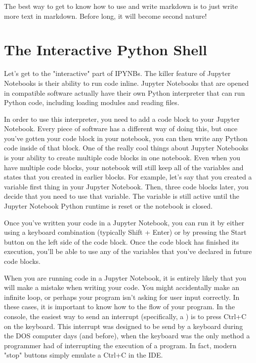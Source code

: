 The best way to get to know how to use and write markdown is to just write more text in markdown. Before long, it will become second nature!\par
\section{The Interactive Python Shell}
Let's get to the "interactive" part of IPYNBs. The killer feature of Jupyter Notebooks is their ability to run code inline. Jupyter Notebooks that are opened in compatible software actually have their own Python interpreter that can run Python code, including loading modules and reading files.\par
In order to use this interpreter, you need to add a code block to your Jupyter Notebook. Every piece of software has a different way of doing this, but once you've gotten your code block in your notebook, you can then write any Python code inside of that block. One of the really cool things about Jupyter Notebooks is your ability to create multiple code blocks in one notebook. Even when you have multiple code blocks, your notebook will still keep all of the variables and states that you created in earlier blocks. For example, let's say that you created a variable first thing in your Jupyter Notebook. Then, three code blocks later, you decide that you need to use that variable. The variable is still active until the Jupyter Notebook Python runtime is reset or the notebook is closed.\par
Once you've written your code in a Jupyter Notebook, you can run it by either using a keyboard combination (typically Shift + Enter) or by pressing the Start button on the left side of the code block. Once the code block has finished its execution, you'll be able to use any of the variables that you've declared in future code blocks.\par
When you are running code in a Jupyter Notebook, it is entirely likely that you will make a mistake when writing your code. You might accidentally make an infinite loop, or perhaps your program isn't asking for user input correctly. In these cases, it is important to know how to  the flow of your program. In the console, the easiest way to send an interrupt (specifically, a ) is to press Ctrl+C on the keyboard. This interrupt was designed to be send by a keyboard during the DOS computer days (and before), when the keyboard was the only method a programmer had of interrupting the execution of a program. In fact, modern "stop" buttons simply emulate a Ctrl+C in the IDE. 
